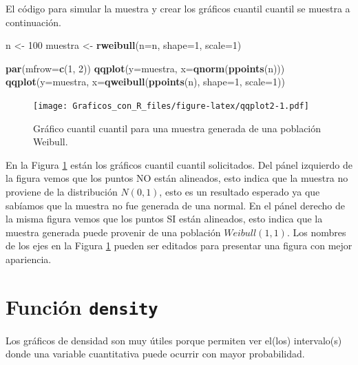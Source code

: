 \documentclass[10pt,]{krantz}
\makeatletter
\newenvironment{Shaded}{\begin{snugshade}}{\end{snugshade}}
\newcommand{\KeywordTok}[1]{\textcolor[rgb]{0.13,0.29,0.53}{\textbf{{#1}}}}
\newcommand{\DataTypeTok}[1]{\textcolor[rgb]{0.13,0.29,0.53}{{#1}}}
\newcommand{\DecValTok}[1]{\textcolor[rgb]{0.00,0.00,0.81}{{#1}}}
\newcommand{\StringTok}[1]{\textcolor[rgb]{0.31,0.60,0.02}{{#1}}}
\newcommand{\NormalTok}[1]{{#1}}
\newenvironment{kframe}{%
\medskip{}
\setlength{\fboxsep}{.8em}
 \def\at@end@of@kframe{}%
 \ifinner\ifhmode%
  \def\at@end@of@kframe{\end{minipage}}%
  \begin{minipage}{\columnwidth}%
 \fi\fi%
 \def\FrameCommand##1{\hskip\@totalleftmargin \hskip-\fboxsep
 \colorbox{shadecolor}{##1}\hskip-\fboxsep
     \hskip-\linewidth \hskip-\@totalleftmargin \hskip\columnwidth}%
 \MakeFramed {\advance\hsize-\width
   \@totalleftmargin\z@ \linewidth\hsize
   \@setminipage}}%
 {\par\unskip\endMakeFramed%
 \at@end@of@kframe}
\renewenvironment{Shaded}{\begin{kframe}}{\end{kframe}}
\makeatother
\begin{document}
El código para simular la muestra y crear los gráficos cuantil cuantil
se muestra a continuación.

\begin{Shaded}
\begin{Highlighting}[]
\NormalTok{n <-}\StringTok{ }\DecValTok{100}
\NormalTok{muestra <-}\StringTok{ }\KeywordTok{rweibull}\NormalTok{(}\DataTypeTok{n=}\NormalTok{n, }\DataTypeTok{shape=}\DecValTok{1}\NormalTok{, }\DataTypeTok{scale=}\DecValTok{1}\NormalTok{)}

\KeywordTok{par}\NormalTok{(}\DataTypeTok{mfrow=}\KeywordTok{c}\NormalTok{(}\DecValTok{1}\NormalTok{, }\DecValTok{2}\NormalTok{))}
\KeywordTok{qqplot}\NormalTok{(}\DataTypeTok{y=}\NormalTok{muestra, }\DataTypeTok{x=}\KeywordTok{qnorm}\NormalTok{(}\KeywordTok{ppoints}\NormalTok{(n)))}
\KeywordTok{qqplot}\NormalTok{(}\DataTypeTok{y=}\NormalTok{muestra, }\DataTypeTok{x=}\KeywordTok{qweibull}\NormalTok{(}\KeywordTok{ppoints}\NormalTok{(n), }\DataTypeTok{shape=}\DecValTok{1}\NormalTok{, }\DataTypeTok{scale=}\DecValTok{1}\NormalTok{))}
\end{Highlighting}
\end{Shaded}

\begin{figure}[htbp]
\centering
\texttt{[image: Graficos\_con\_R\_files/figure-latex/qqplot2-1.pdf]}
\caption{\label{fig:qqplot2}Gráfico cuantil cuantil para una muestra
generada de una población Weibull.}
\end{figure}

En la Figura \ref{fig:qqplot2} están los gráficos cuantil cuantil
solicitados. Del pánel izquierdo de la figura vemos que los puntos NO
están alineados, esto indica que la muestra no proviene de la
distribución \(N(0, 1)\), esto es un resultado esperado ya que sabíamos
que la muestra no fue generada de una normal. En el pánel derecho de la
misma figura vemos que los puntos SI están alineados, esto indica que la
muestra generada puede provenir de una población \(Weibull(1, 1)\). Los
nombres de los ejes en la Figura \ref{fig:qqplot2} pueden ser editados
para presentar una figura con mejor apariencia.

\section{\texorpdfstring{Función \texttt{density} 
}{Función density  }}\label{funcion-density}

Los gráficos de densidad son muy útiles porque permiten ver el(los)
intervalo(s) donde una variable cuantitativa puede ocurrir con mayor
probabilidad.
\end{document}
